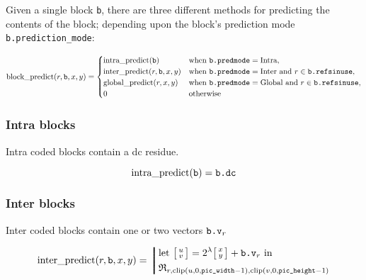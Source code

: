 
Given a single block \verb|b|, there are three different methods for
predicting the contents of the block; depending upon the block's
prediction mode \verb|b.prediction_mode|:

\begin{equation*}
\text{block\_predict}(r,\text{\texttt{b}},x,y) =
  \begin{cases}
    \text{intra\_predict}(\text{\texttt{b}}) & \text{when }\text{\texttt{b.predmode}} = \text{Intra},\\
    \text{inter\_predict}(r,\text{\texttt{b}},x,y) & \text{when }\text{\texttt{b.predmode}} = \text{Inter} \text{ and } r \in \text{\texttt{b.refsinuse}},\\
    \text{global\_predict}(r,x,y) & \text{when }\text{\texttt{b.predmode}} = \text{Global} \text{ and } r \in \text{\texttt{b.refsinuse}},\\
    0 & \text{otherwise}
  \end{cases}
\end{equation*}

\subsubsection{Intra blocks}
Intra coded blocks contain a dc residue.

\begin{equation*}
\text{intra\_predict}(\text{\texttt{b}}) = \text{\texttt{b.dc}}
\end{equation*}

\subsubsection{Inter blocks}
Inter coded blocks contain one or two vectors $\text{\texttt{b.v}}_r$

\providecommand{\vv}[0]{\bigl[\begin{smallmatrix}u\\v\end{smallmatrix}\bigr]}
\providecommand{\V}[0]{\bigl[\begin{smallmatrix}x\\y\end{smallmatrix}\bigr]}
\begin{equation*}
\text{inter\_predict}(r,\B,x,y) =
  \left\bracevert\begin{aligned}
    &\text{let } \vv = 2^\lambda\V + \Bv_r \text{ in}\\
    &\URef_{r,\clip(u, 0, \picWidth-1), \clip(v, 0, \picHeight-1)}
    \end{aligned}\right.
\end{equation*}

